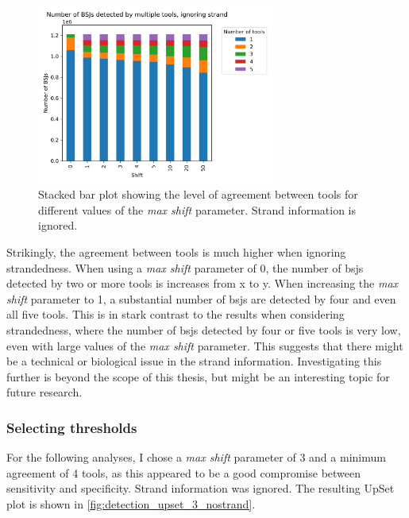 \begin{figure}[H]
    \centering

    \includegraphics[width=0.7\textwidth]{chapters/4_results_and_discussion/figures/detection/shift_agreement_unstranded.png}
    \caption{Stacked bar plot showing the level of agreement between tools for
        different values of the \textit{max shift} parameter.
        Strand information is ignored.
    }
    \label{fig:shift_agreement_unstranded}
\end{figure}

Strikingly, the agreement between tools is much higher when ignoring
strandedness.
When using a \textit{max shift} parameter of 0, the number of \glspl{bsj}
detected by two or more tools is increases from x to y.
When increasing the \textit{max shift} parameter to 1, a substantial number of
\glspl{bsj} are detected by four and even all five tools.
This is in stark contrast to the results when considering strandedness, where
the number of \glspl{bsj} detected by four or five tools is very low, even with
large values of the \textit{max shift} parameter.
This suggests that there might be a technical or biological issue in the strand
information.
Investigating this further is beyond the scope of this thesis, but might be an
interesting topic for future research.

\subsubsection{Selecting thresholds}

For the following analyses, I chose a \textit{max shift} parameter of 3 and a
minimum agreement of 4 tools, as this appeared to be a good compromise between
sensitivity and specificity.
Strand information was ignored.
The resulting UpSet plot is shown in \cref{fig:detection_upset_3_nostrand}.

